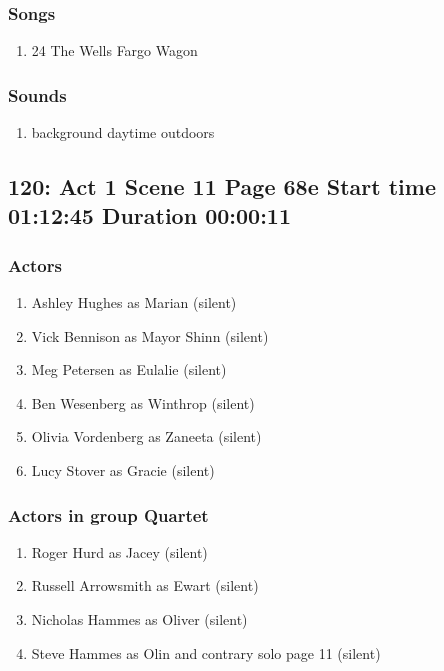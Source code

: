 \subsubsection{Songs}
\begin{enumerate}
\item 24 The Wells Fargo Wagon
\end{enumerate}\subsubsection{Sounds}
\begin{enumerate}
\item background daytime outdoors
\end{enumerate}
\subsection{120: Act 1 Scene 11 Page 68e Start time 01:12:45 Duration 00:00:11}

\subsubsection{Actors}
\begin{enumerate}
\item Ashley Hughes as Marian (silent)
\item Vick Bennison as Mayor Shinn (silent)
\item Meg Petersen as Eulalie (silent)
\item Ben Wesenberg as Winthrop (silent)
\item Olivia Vordenberg as Zaneeta (silent)
\item Lucy Stover as Gracie (silent)
\end{enumerate}
\subsubsection{Actors in group Quartet}
\begin{enumerate}
\item Roger Hurd as Jacey (silent)
\item Russell Arrowsmith as Ewart (silent)
\item Nicholas Hammes as Oliver (silent)
\item Steve Hammes as Olin and contrary solo page 11 (silent)
\end{enumerate}
